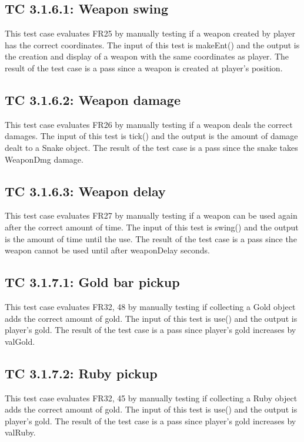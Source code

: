 \documentclass[12pt, titlepage]{article}
\begin{document}
\subsection*{TC 3.1.6.1: Weapon swing}

This test case evaluates FR25 by manually testing if a weapon created by player has the correct coordinates. The input of this test is makeEnt() and the output is the creation and display of a weapon with the same coordinates as player. The result of the test case is a pass since a weapon is created at player's position. 

\subsection*{TC 3.1.6.2: Weapon damage}

This test case evaluates FR26 by manually testing if a weapon deals the correct damages. The input of this test is tick() and the output is the amount of damage dealt to a Snake object. The result of the test case is a pass since the snake takes WeaponDmg damage. 

\subsection*{TC 3.1.6.3: Weapon delay}

This test case evaluates FR27 by manually testing if a weapon can be used again after the correct amount of time. The input of this test is swing() and the output is the amount of time until the use. The result of the test case is a pass since the weapon cannot be used until after weaponDelay seconds. 

\subsection*{TC 3.1.7.1: Gold bar pickup}

This test case evaluates FR32, 48 by manually testing if collecting a Gold object adds the correct amount of gold. The input of this test is use() and the output is player's gold. The result of the test case is a pass since player's gold increases by valGold.

\subsection*{TC 3.1.7.2: Ruby pickup}

This test case evaluates FR32, 45 by manually testing if collecting a Ruby object adds the correct amount of gold. The input of this test is use() and the output is player's gold. The result of the test case is a pass since player's gold increases by valRuby.
\end{document}
